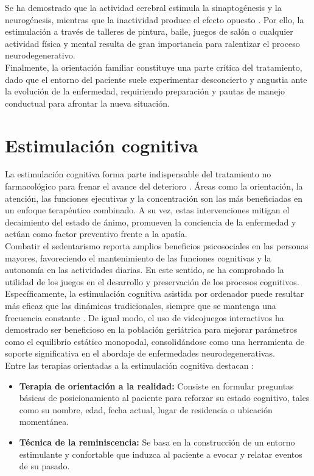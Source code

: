 Se ha demostrado que la actividad cerebral estimula la sinaptogénesis y la neurogénesis, mientras que la inactividad produce el efecto opuesto \cite{castillo2020neuroplasticidad}. Por ello, la estimulación a través de talleres de pintura, baile, juegos de salón o cualquier actividad física y mental resulta de gran importancia para ralentizar el proceso neurodegenerativo.\\

Finalmente, la orientación familiar constituye una parte crítica del tratamiento, dado que el entorno del paciente suele experimentar desconcierto y angustia ante la evolución de la enfermedad, requiriendo preparación y pautas de manejo conductual para afrontar la nueva situación.

\section{Estimulación cognitiva}
La estimulación cognitiva forma parte indispensable del tratamiento no farmacológico para frenar el avance del deterioro \cite{castillo2020neuroplasticidad}. Áreas como la orientación, la atención, las funciones ejecutivas y la concentración son las más beneficiadas en un enfoque terapéutico combinado. A su vez, estas intervenciones mitigan el decaimiento del estado de ánimo, promueven la conciencia de la enfermedad y actúan como factor preventivo frente a la apatía.\\

Combatir el sedentarismo reporta amplios beneficios psicosociales en las personas mayores, favoreciendo el mantenimiento de las funciones cognitivas y la autonomía en las actividades diarias. En este sentido, se ha comprobado la utilidad de los juegos en el desarrollo y preservación de los procesos cognitivos. Específicamente, la estimulación cognitiva asistida por ordenador puede resultar más eficaz que las dinámicas tradicionales, siempre que se mantenga una frecuencia constante \cite{garcia2022eficacia}. De igual modo, el uso de videojuegos interactivos ha demostrado ser beneficioso en la población geriátrica para mejorar parámetros como el equilibrio estático monopodal, consolidándose como una herramienta de soporte significativa en el abordaje de enfermedades neurodegenerativas.\\

Entre las terapias orientadas a la estimulación cognitiva destacan \cite{castillo2020neuroplasticidad}:
\begin{itemize}
    \item \textbf{Terapia de orientación a la realidad:} Consiste en formular preguntas básicas de posicionamiento al paciente para reforzar su estado cognitivo, tales como su nombre, edad, fecha actual, lugar de residencia o ubicación momentánea.
    \item \textbf{Técnica de la reminiscencia:} Se basa en la construcción de un entorno estimulante y confortable que induzca al paciente a evocar y relatar eventos de su pasado.
\end{itemize}

